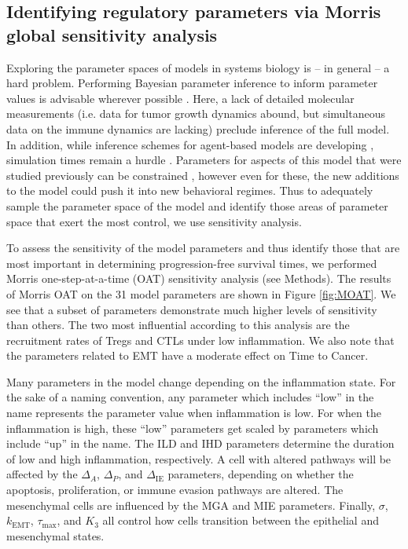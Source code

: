 \documentclass[11pt]{article}
\begin{document}
\subsection{Identifying regulatory parameters via Morris global sensitivity analysis}\label{SensAnalysis}
Exploring the parameter spaces of models in systems biology is -- in general -- a hard problem. Performing Bayesian parameter inference to inform parameter values is advisable wherever possible \cite{kirk13_model}. Here, a lack of detailed molecular measurements  (i.e. data for tumor growth dynamics abound, but simultaneous data on the immune dynamics are lacking) preclude inference of the full model. In addition, while inference schemes for agent-based models are developing \cite{gallaher17_hybrid, warne19_simulation}, simulation times remain a hurdle \cite{lambert18_bayesian}. Parameters for aspects of this model that were studied previously can be constrained \cite{guo17_multiscale}, however even for these, the new additions to the model could push it into new behavioral regimes. Thus to adequately sample the parameter space of the model and identify those areas of parameter space that exert the most control, we use sensitivity analysis.   
\par
To assess the sensitivity of the model parameters and thus identify those that are most important in determining progression-free survival times, we performed Morris one-step-at-a-time (OAT) sensitivity analysis (see Methods). 
The results of Morris OAT on the 31 model parameters are shown in Figure \ref{fig:MOAT}. We see that a subset of parameters demonstrate much higher levels of sensitivity than others.
The two most influential according to this analysis are the recruitment rates of Tregs and CTLs under low inflammation.
We also note that the parameters related to EMT have a moderate effect on Time to Cancer.
\par 
Many parameters in the model change depending on the inflammation state.
For the sake of a naming convention, any parameter which includes ``low'' in the name represents the parameter value when inflammation is low.
For when the inflammation is high, these ``low'' parameters get scaled by parameters which include ``up'' in the name.
The ILD and IHD parameters determine the duration of low and high inflammation, respectively.
A cell with altered pathways will be affected by the $\Delta_A$, $\Delta_P$, and $\Delta_{\text{IE}}$ parameters, depending on whether the apoptosis, proliferation, or immune evasion pathways are altered.
The mesenchymal cells are influenced by the MGA and MIE parameters.
Finally, $\sigma$, $k_\text{EMT}$, $\tau_\text{max}$, and $K_3$ all control how cells transition between the epithelial and mesenchymal states.
\end{document}
